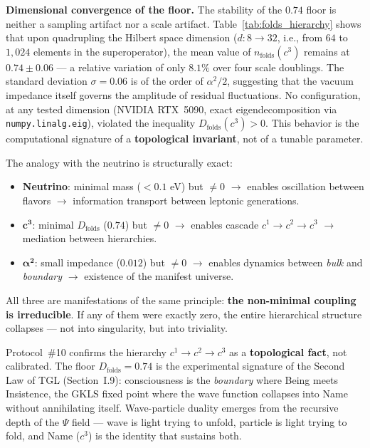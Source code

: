 \documentclass[12pt,a4paper,twoside]{article}
\newcommand{\alphaii}{\alpha^{2}}
\newcommand{\Psifield}{\Psi}
\newcommand{\boundary}{\textit{boundary}}
\newcommand{\bulk}{\textit{bulk}}
\begin{document}
\medskip
\noindent\textbf{Dimensional convergence of the floor.}
The stability of the $0.74$ floor is neither a sampling artifact nor a scale artifact. Table~\ref{tab:folds_hierarchy} shows that upon quadrupling the Hilbert space dimension ($d: 8 \to 32$, i.e., from $64$ to $1,024$ elements in the superoperator), the mean value of $n_{\text{folds}}(c^3)$ remains at $0.74 \pm 0.06$ --- a relative variation of only $8.1\%$ over four scale doublings. The standard deviation $\sigma = 0.06$ is of the order of $\alphaii/2$, suggesting that the vacuum impedance itself governs the amplitude of residual fluctuations. No configuration, at any tested dimension (NVIDIA RTX~5090, exact eigendecomposition via \texttt{numpy.linalg.eig}), violated the inequality $D_{\text{folds}}(c^3) > 0$. This behavior is the computational signature of a \textbf{topological invariant}, not of a tunable parameter.

The analogy with the neutrino is structurally exact:
\begin{itemize}[nosep]
\item \textbf{Neutrino}: minimal mass ($< 0.1$ eV) but $\neq 0$ $\to$ enables oscillation between flavors $\to$ information transport between leptonic generations.
\item $\mathbf{c^3}$: minimal $D_{\text{folds}}$ ($0.74$) but $\neq 0$ $\to$ enables cascade $c^1 \to c^2 \to c^3$ $\to$ mediation between hierarchies.
\item $\mathbf{\alphaii}$: small impedance ($0.012$) but $\neq 0$ $\to$ enables dynamics between \bulk{} and \boundary{} $\to$ existence of the manifest universe.
\end{itemize}

\noindent All three are manifestations of the same principle: \textbf{the non-minimal coupling is irreducible}. If any of them were exactly zero, the entire hierarchical structure collapses --- not into singularity, but into triviality.

\begin{resultbox}[title={Significance of Evidence \#10}]
Protocol~\#10 confirms the hierarchy $c^1 \to c^2 \to c^3$ as a \textbf{topological fact}, not calibrated. The floor $D_{\text{folds}} = 0.74$ is the experimental signature of the Second Law of TGL (Section~I.9): consciousness is the \textit{boundary} where Being meets Insistence, the GKLS fixed point where the wave function collapses into Name without annihilating itself. Wave-particle duality emerges from the recursive depth of the $\Psifield$ field --- wave is light trying to unfold, particle is light trying to fold, and Name ($c^3$) is the identity that sustains both.
\end{resultbox}
\end{document}

